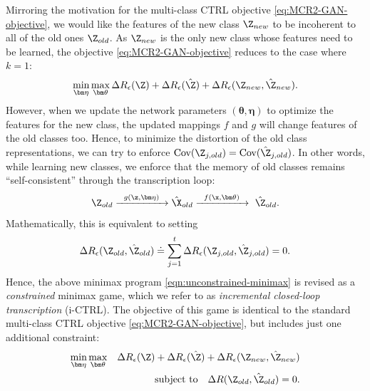 \documentclass[../../book-main.tex]{subfiles}
\begin{document}
Mirroring the motivation for the multi-class CTRL objective \eqref{eq:MCR2-GAN-objective}, we would like the features of the new class $\Z_{new}$ to be incoherent to all of the old ones $\Z_{old}$. As $\Z_{new}$ is the only new class whose features need to be learned, the objective \eqref{eq:MCR2-GAN-objective} reduces to the case where $k=1$:
\begin{equation}
\min_{\bm \eta} \max_{\bm \theta} \Delta{R_\epsilon(\Z)} + \Delta{R_\epsilon(\hat{\Z})}+\Delta{R_\epsilon(\Z_{new},\hat{\Z}_{new})}.
\label{eqn:unconstrained-minimax}
\end{equation}
However, when we update the network parameters $(\bm \theta,\bm \eta)$ to optimize the features for the new class, the updated mappings $f$ and $g$ will change features of the old classes too. Hence, to minimize the distortion of the old class representations, we can try to enforce $\mbox{Cov}(\Z_{j,old}) = \mbox{Cov}(\hat{\Z}_{j,old})$. In other words, while learning new classes, we enforce that the memory of old classes remains ``self-consistent'' through the transcription loop:
\begin{equation}
\Z_{old} \xrightarrow{\hspace{2mm} g(\z,\bm \eta) \hspace{2mm}} \hat \X_{old} \xrightarrow{\hspace{2mm} f(\x, \bm \theta)\hspace{2mm}} \ \hat \Z_{old}.
\end{equation}
Mathematically, this is equivalent to setting 
$$\Delta R_\epsilon(\Z_{old},\hat{\Z}_{old}) \doteq  \sum_{j=1}^t \Delta R_\epsilon(\Z_{j,old},\hat{\Z}_{j,old}) = 0.$$  
Hence, the above minimax program \eqref{eqn:unconstrained-minimax} is revised as a {\em constrained} minimax game, which we refer to as  {\em incremental closed-loop transcription} (i-CTRL).
The objective of this game is identical to the standard multi-class CTRL objective \eqref{eq:MCR2-GAN-objective}, but includes just one additional constraint:
\begin{eqnarray}
\min_{\bm \eta} \max_{\bm \theta}  &&\Delta{R_\epsilon(\Z)}+\Delta{R_\epsilon(\hat{\Z})}+\Delta{R_\epsilon(\Z_{new},\hat{\Z}_{new})} \nonumber\\
&& \mbox{subject to} \quad  \Delta R(\Z_{old},\hat{\Z}_{old}) = 0.
\label{eqn:constrained-minimax}
\end{eqnarray}
\end{document}
